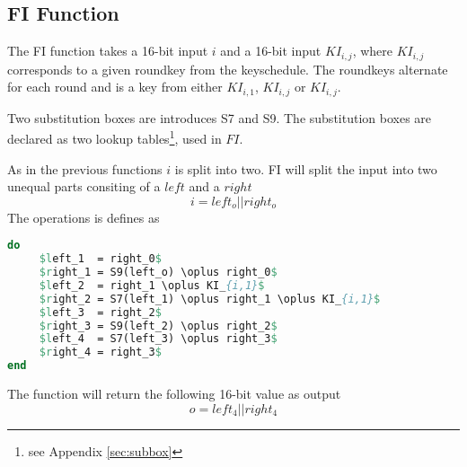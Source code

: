 \subsection{FI Function}
The FI function takes a 16-bit input $i$ and a 16-bit input $KI_{i,j}$,
where $KI_{i,j}$ corresponds to a given roundkey from the keyschedule. The
roundkeys alternate for each round and is a key from either $KI_{i,1}$, $KI_{i,j}$
or $KI_{i,j}$.

Two substitution boxes are introduces S7 and S9. The substitution
boxes are declared as two lookup tables\footnote{see Appendix
  \ref{sec:subbox}}, used in $FI$.

As in the previous functions $i$ is split into two. FI will split the
input into two unequal parts consiting of a  $left$ and a
 $right$
\[ i = left_o || right_o \]
The operations is defines as
\begin{lstlisting}[frame=single, language=Pascal, mathescape,
captionpos=b, caption={Pseudo code for $FI$ function}]
do
     $left_1  = right_0$
     $right_1 = S9(left_o) \oplus right_0$
     $left_2  = right_1 \oplus KI_{i,1}$
     $right_2 = S7(left_1) \oplus right_1 \oplus KI_{i,1}$
     $left_3  = right_2$
     $right_3 = S9(left_2) \oplus right_2$
     $left_4  = S7(left_3) \oplus right_3$
     $right_4 = right_3$
end
\end{lstlisting}
The function will return the following 16-bit value as output
\[o = left_4 || right_4\]

